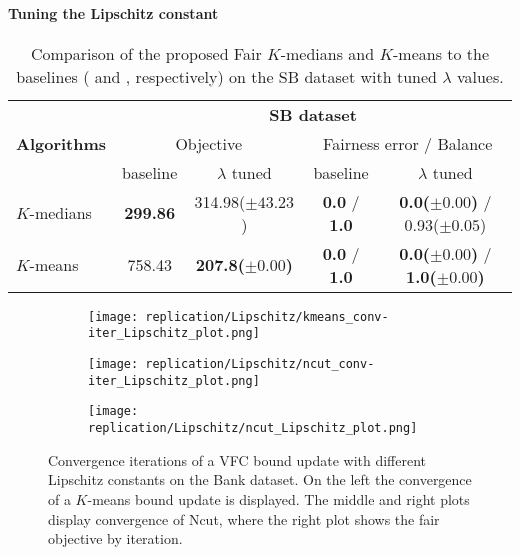 \paragraph{Tuning the Lipschitz constant}\label{ssec:tunelambdalipschitz}
\begin{table}[]
    \small
    \centering
    \begin{tabular}{|l|c|c|c|c|}
        \hline
            & \multicolumn{4}{c|}{\textbf{SB dataset}} \\
            \cline{2-5}
        \textbf{Algorithms} & \multicolumn{2}{c|}{Objective} &   \multicolumn{2}{c|}{Fairness error / Balance} \\ \cline{2-5}
        & baseline & $\lambda$ tuned & baseline & $\lambda$ tuned \\
        \hline
        $K$-medians & \textbf{299.86} & 314.98($\pm 43.23$) & \textbf{0.0} / \textbf{1.0} & \textbf{0.0($\pm 0.00$)} / 0.93($\pm 0.05$) \\
        $K$-means & 758.43 & \textbf{207.8($\pm 0.00$)} & \textbf{0.0} / \textbf{1.0} & \textbf{0.0($\pm 0.00$)} / \textbf{1.0($\pm 0.00$)} \\
        \hline
    \end{tabular}
    \caption{Comparison of the proposed Fair $K$-medians and $K$-means to the baselines (\citep{backurs2019scalable} and \citep{bera2019fair}, respectively) on the SB dataset with tuned $\lambda$ values.}
    \label{tab:comparison_baselineVSlmbda-tuned}
\end{table}

\begin{figure}
    \centering
    \begin{subfigure}{0.25\linewidth}
        \centering
        \texttt{[image: replication/Lipschitz/kmeans\_conv-iter\_Lipschitz\_plot.png]}
        \label{fig:Bank_kmeans_Lipschitz_bar}
    \end{subfigure}
    \begin{subfigure}{0.25\linewidth}
        \centering
        \texttt{[image: replication/Lipschitz/ncut\_conv-iter\_Lipschitz\_plot.png]}
        \label{fig:Bank_ncut_Lipschitz_bar}
    \end{subfigure}
    \begin{subfigure}{0.25\linewidth}
        \centering
        \texttt{[image: replication/Lipschitz/ncut\_Lipschitz\_plot.png]}
        \label{fig:Bank_ncut_Lipschitz}
    \end{subfigure}    
    \caption{Convergence iterations of a VFC bound update with different Lipschitz constants on the Bank dataset. On the left the convergence of a $K$-means bound update is displayed. The middle and right plots display convergence of Ncut, where the right plot shows the fair objective by iteration.}
    \label{fig:Lipschitz_experiments}
\end{figure}

